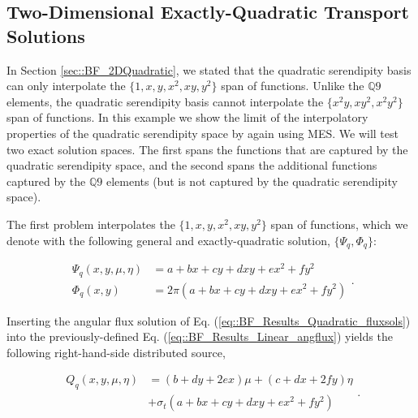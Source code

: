 \subsection{Two-Dimensional Exactly-Quadratic Transport Solutions}
\label{sec::BF_Results_Quadratic}

In Section \ref{sec::BF_2DQuadratic}, we stated that the quadratic serendipity basis can only interpolate the $\{ 1, x, y, x^2, xy, y^2 \}$ span of functions. Unlike the $\mathbb{Q}9$ elements, the quadratic serendipity basis cannot interpolate the $\{ x^2y, x y^2, x^2 y^2 \}$ span of functions. In this example we show the limit of the interpolatory properties of the quadratic serendipity space by again using MES. We will test two exact solution spaces. The first spans the functions that are captured by the quadratic serendipity space, and the second spans the additional functions captured by the $\mathbb{Q}9$ elements (but is not captured by the quadratic serendipity space).

The first problem interpolates the $\{ 1, x, y, x^2, xy, y^2 \}$ span of functions, which we denote with the following general and exactly-quadratic solution, $\{\Psi_q, \Phi_q\}$:

\begin{equation}
\label{eq::BF_Results_Quadratic_fluxsols}
\begin{aligned}
\Psi_q (x,y,\mu,\eta) &= a + bx + c y+ d xy + e x^2 + fy^2 \\
\Phi_q (x,y) &= 2 \pi \left(  a + bx + c y+ d xy + e x^2 + fy^2 \right)
\end{aligned} .
\end{equation}

\noindent Inserting the angular flux solution of Eq. (\ref{eq::BF_Results_Quadratic_fluxsols}) into the previously-defined Eq. (\ref{eq::BF_Results_Linear_angflux}) yields the following right-hand-side distributed source,

\begin{equation}
\label{eq::BF_Results_Quadratic_rhs}
\begin{aligned}
Q_q (x,y,\mu,\eta) &=  \left( b+d y+2 e x \right) \mu + \left( c+d x+2 f y \right) \eta \\
&+ \sigma_t \left( a + bx + c y+ d xy + e x^2 + fy^2 \right)
\end{aligned} .
\end{equation}

